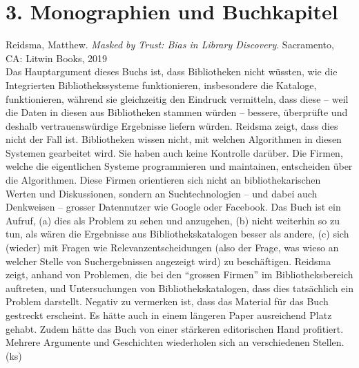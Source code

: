 \documentclass[a4paper,
fontsize=11pt,
oneside,
numbers=noperiodatend,
parskip=half-,
bibliography=totoc,
final
]{scrartcl}
\begin{document}
\hypertarget{monographien-und-buchkapitel}{%
\section{3. Monographien und
Buchkapitel}\label{monographien-und-buchkapitel}}

Reidsma, Matthew. \emph{Masked by Trust: Bias in Library Discovery}.
Sacramento, CA: Litwin Books, 2019\\
Das Hauptargument dieses Buchs ist, dass Bibliotheken nicht wüssten, wie
die Integrierten Bibliothekssysteme funktionieren, insbesondere die
Kataloge, funktionieren, während sie gleichzeitig den Eindruck
vermitteln, dass diese -- weil die Daten in diesen aus Bibliotheken
stammen würden -- bessere, überprüfte und deshalb vertrauenswürdige
Ergebnisse liefern würden. Reidsma zeigt, dass dies nicht der Fall ist.
Bibliotheken wissen nicht, mit welchen Algorithmen in diesen Systemen
gearbeitet wird. Sie haben auch keine Kontrolle darüber. Die Firmen,
welche die eigentlichen Systeme programmieren und maintainen,
entscheiden über die Algorithmen. Diese Firmen orientieren sich nicht an
bibliothekarischen Werten und Diskussionen, sondern an Suchtechnologien
-- und dabei auch Denkweisen -- grosser Datennutzer wie Google oder
Facebook. Das Buch ist ein Aufruf, (a) dies als Problem zu sehen und
anzugehen, (b) nicht weiterhin so zu tun, als wären die Ergebnisse aus
Bibliothekskatalogen besser als andere, (c) sich (wieder) mit Fragen wie
Relevanzentscheidungen (also der Frage, was wieso an welcher Stelle von
Suchergebnissen angezeigt wird) zu beschäftigen. Reidsma zeigt, anhand
von Problemen, die bei den ``grossen Firmen'' im Bibliotheksbereich
auftreten, und Untersuchungen von Bibliothekskatalogen, dass dies
tatsächlich ein Problem darstellt. Negativ zu vermerken ist, dass das
Material für das Buch gestreckt erscheint. Es hätte auch in einem
längeren Paper ausreichend Platz gehabt. Zudem hätte das Buch von einer
stärkeren editorischen Hand profitiert. Mehrere Argumente und
Geschichten wiederholen sich an verschiedenen Stellen. (ks)
\end{document}
